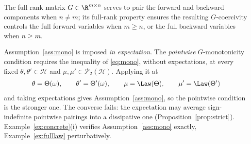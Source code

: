 \begin{remark}\label{rem:G-pairing}
The full-rank matrix $G\in\R^{m\times n}$ serves to pair the forward and backward
components when $n\neq m$; its full-rank property ensures the resulting $G$-coercivity
controls the full forward variables when $m\ge n$, or the full backward variables when
$n\ge m$.
\end{remark}
\begin{remark}\label{rem:diag-mono}
Assumption~\ref{ass:mono} is imposed \emph{in expectation}. The \emph{pointwise}
$G$-monotonicity condition requires the inequality of \eqref{eq:mono}, without expectations,
at every fixed $\theta,\theta'\in\mathcal H$ and $\mu,\mu'\in\mathcal P_2(\mathcal H)$.
Applying it at
\[
\theta=\Theta(\omega),\qquad \theta'=\Theta'(\omega),\qquad
\mu=\Law(\Theta),\qquad \mu'=\Law(\Theta')
\]
and taking expectations gives Assumption~\ref{ass:mono}, so the
pointwise condition is the stronger one. The converse
fails: the expectation may average sign-indefinite pointwise pairings into a dissipative one
(Proposition~\ref{prop:strict}). Example~\ref{ex:concrete}(i) verifies
Assumption~\ref{ass:mono} exactly, Example~\ref{ex:fulllaw} perturbatively.
\end{remark}

